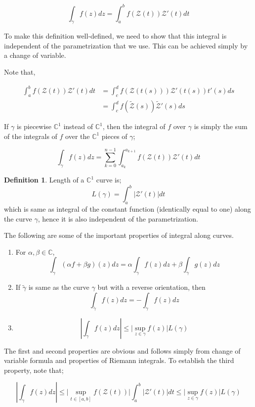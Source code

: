 \documentclass[12pt]{article}
\newcommand{\C}{\mathbb{C}}
\newcommand{\zcal}{\mathcal{Z}}
\theoremstyle{definition}
\newtheorem{defn}{Definition}
\newenvironment{definition}{
\begin{tcolorbox}[colback=green!5!white,colframe=green!75!black, parbox = false]\begin{defn} }{\end{defn}\end{tcolorbox} }
\begin{document}
$$\int_{\gamma} f(z) dz = \int_{a}^{b} f(\zcal(t))\zcal'(t)dt$$

To make this definition well-defined, we need to show that this integral is independent of the parametrization that we use. This can be achieved simply by a change of variable.

Note that,

\begin{align*}
    \int_{a}^{b} f(\zcal(t))\zcal'(t)dt
    & = \int_{c}^{d} f(\zcal(t(s)))\zcal'(t(s))t'(s) ds\\
    & = \int_{c}^{d} f(\widetilde{\zcal}(s)) \widetilde{\zcal}'(s)ds
\end{align*}

If $\gamma$ is piecewise $\C^1$ instead of $\C^1$, then the integral of $f$ over $\gamma$ is simply the sum of the integrals of $f$ over the $\C^1$ pieces of $\gamma$;

$$\int_{\gamma} f(z)dz = \sum_{k=0}^{n-1} \int_{a_k}^{a_{k+1}} f(\zcal(t)) \zcal'(t) dt $$

\begin{definition}
    Length of a $\C^1$ curve is;
    $$L(\gamma) = \int_{a}^{b} \vert \zcal'(t) \vert dt $$
    which is same as integral of the constant function (identically equal to one) along the curve $\gamma$, hence it is also independent of the parametrization.
\end{definition}

The following are some of the important properties of integral along curves.

\begin{enumerate}
    \item For $\alpha, \beta \in \C$, 
    $$\int_{\gamma} (\alpha f + \beta g)(z) dz = \alpha \int_{\gamma} f(z)dz + \beta \int_{\gamma} g(z)dz $$
    \item If $\tilde{\gamma}$ is same as the curve $\gamma$ but with a reverse orientation, then 
    $$\int_{\tilde{\gamma}} f(z)dz = - \int_{\gamma} f(z)dz$$
    \item $$\left\vert \int_{\gamma} f(z)dz \right\vert \leq \vert \sup_{z \in \gamma}f(z) \vert L(\gamma)$$
\end{enumerate}

The first and second properties are obvious and follows simply from change of variable formula and properties of Riemann integrals. To establish the third property, note that;

$$\left\vert \int_{\gamma} f(z)dz \right\vert \leq \vert \sup_{t \in [a, b]}f(\zcal(t)) \vert \int_{a}^{b} \vert \zcal'(t)\vert dt \leq \vert \sup_{z \in \gamma}f(z) \vert L(\gamma)$$
\end{document}
